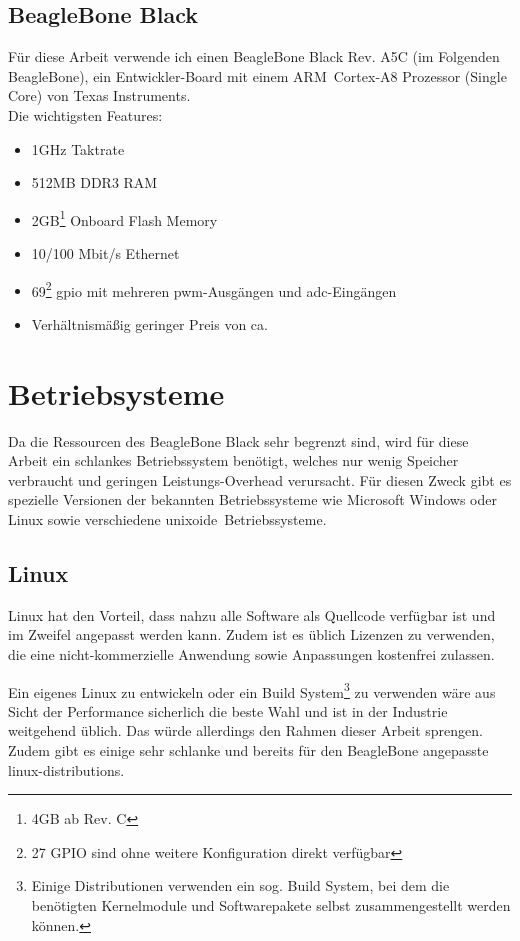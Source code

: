\subsection{BeagleBone Black}
Für diese Arbeit verwende ich einen BeagleBone Black Rev. A5C (im Folgenden BeagleBone), ein Entwickler-Board mit einem ARM\textregistered ~Cortex\texttrademark -A8 Prozessor (Single Core) von Texas Instruments.\\

\noindent Die wichtigsten Features:
\begin{itemize}
  \item 1GHz Taktrate
  \item 512MB DDR3 RAM
  \item 2GB\footnote{4GB ab Rev. C} Onboard Flash Memory
  \item 10/100 Mbit/s Ethernet
  \item 69\footnote{27 GPIO sind ohne weitere Konfiguration direkt verfügbar} \gls{gpio} mit mehreren \gls{pwm}-Ausgängen und \gls{adc}-Eingängen
  \item Verhältnismäßig geringer Preis von ca. 
\end{itemize}


\section{Betriebsysteme}
Da die Ressourcen des BeagleBone Black sehr begrenzt sind, wird für diese Arbeit ein schlankes Betriebssystem benötigt, welches nur wenig Speicher verbraucht und geringen Leistungs-Overhead verursacht. Für diesen Zweck gibt es spezielle Versionen der bekannten Betriebssysteme wie Microsoft Windows oder Linux sowie verschiedene \glqq unixoide\grqq ~Betriebssysteme.


\subsection{Linux}
Linux hat den Vorteil, dass nahzu alle Software als Quellcode verfügbar ist und im Zweifel angepasst werden kann. Zudem ist es üblich Lizenzen zu verwenden, die eine nicht-kommerzielle Anwendung sowie Anpassungen kostenfrei zulassen.

Ein eigenes Linux zu entwickeln oder ein Build System\footnote{Einige Distributionen verwenden ein sog. Build System, bei dem die benötigten Kernelmodule und Softwarepakete selbst zusammengestellt werden können.} zu verwenden wäre aus Sicht der Performance sicherlich die beste Wahl und ist in der Industrie weitgehend üblich. Das würde allerdings den Rahmen dieser Arbeit sprengen. Zudem gibt es einige sehr schlanke und bereits für den BeagleBone angepasste \glspl{linux-distribution}.


